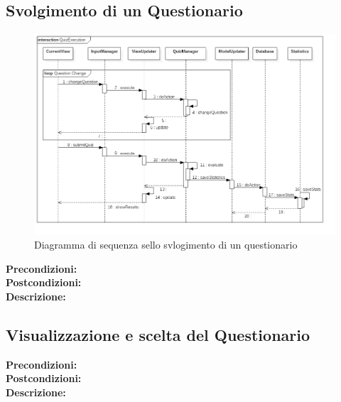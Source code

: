 \documentclass[a4paper,11pt]{article}
\begin{document}
	\subsection{Svolgimento di un Questionario}
	\begin{figure}[h!]
	\begin{center}
		\includegraphics[scale=0.5]{../images/QuizExecution.png}
		\caption{Diagramma di sequenza sello svlogimento di un questionario}
	\end{center}
	\end{figure}
	\textbf{Precondizioni:} \\
	\textbf{Postcondizioni:} \\
	\textbf{Descrizione:} \\
	\newpage
	\subsection{Visualizzazione e scelta del Questionario}
	\textbf{Precondizioni:} \\
	\textbf{Postcondizioni:} \\
	\textbf{Descrizione:} \\
	\newpage
\end{document}
